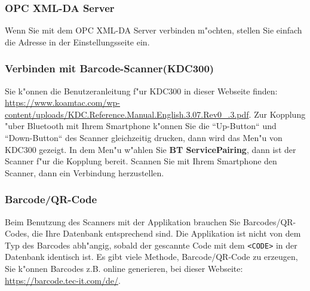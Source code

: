 \documentclass[a4paper,11pt,twoside]{article}
\begin{document}
\subsubsection*{OPC XML-DA Server}
Wenn Sie mit dem OPC XML-DA Server verbinden m"ochten, stellen Sie einfach die Adresse in der Einstellungsseite ein.
\subsubsection*{Verbinden mit Barcode-Scanner(KDC300)}
Sie k"onnen die Benutzeranleitung f"ur KDC300 in dieser Webseite finden: \url{https://www.koamtac.com/wp-content/uploads/KDC.Reference.Manual.English.3.07.Rev0_.3.pdf}. Zur Kopplung "uber Bluetooth mit Ihrem Smartphone k"onnen Sie die ``Up-Button`` und ``Down-Button`` des Scanner gleichzeitig drucken, dann wird das Men"u von KDC300 gezeigt. In dem Men"u w"ahlen Sie \textbf{BT Service}\textbf{\textrightarrow}\textbf{Pairing}, dann ist der Scanner f"ur die Kopplung bereit. Scannen Sie mit Ihrem Smartphone den Scanner, dann ein Verbindung herzustellen.
\subsubsection*{Barcode/QR-Code}
Beim Benutzung des Scanners mit der Applikation brauchen Sie Barcodes/QR-Codes, die Ihre Datenbank entsprechend sind. Die Applikation ist nicht von dem Typ des Barcodes abh"angig, sobald der gescannte Code mit dem \texttt{<CODE>} in der Datenbank identisch ist. Es gibt viele Methode, Barcode/QR-Code zu erzeugen, Sie k"onnen Barcodes z.B. online generieren, bei dieser Webseite: \url{https://barcode.tec-it.com/de/}.
\end{document}
